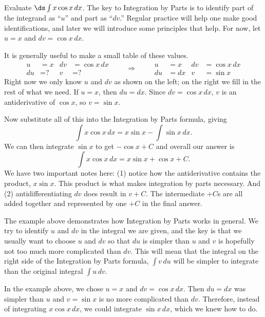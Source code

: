 \begin{example}\label{ex_ibp1}
Evaluate $\ds\int x\cos{x}\,dx$.
\solution
The key to Integration by Parts is to identify part of the integrand as ``$u$'' and part as ``$dv$.'' Regular practice will help one make good identifications, and later we will introduce some principles that help. For now, let  $u=x$ and $dv=\cos{x}\,dx$.

It is generally useful to make a small table of these values.
\[
\begin{aligned}
u&= x & dv&=\cos x\, dx\\
du&= \text{?} & v&=\text{?}
\end{aligned}
\qquad\Rightarrow\qquad
\begin{aligned}
u&= x & dv&=\cos x\, dx\\
du&= dx & v&=\sin x
\end{aligned}
\]
Right now we only know $u$ and $dv$ as shown on the left; on the right we fill in the rest of what we need. If $u = x$, then $du = dx$. Since $dv = \cos x\, dx$, $v$ is an antiderivative of $\cos x$, so $v = \sin x$.

Now substitute all of this into the Integration by Parts formula, giving
\[\int x\cos x\,dx = x\sin x - \int \sin x \,dx.\]
We can then integrate $\sin x$ to get $-\cos x + C$ and overall our answer is
\[\int x\cos x\, dx = x\sin x + \cos x + C.\]
We have two important notes here: (1) notice how the antiderivative contains the product, $x\sin x$. This product is what makes integration by parts necessary. And (2) antidifferentiating $dv$ does result in $v+C$. The intermediate $+C$s are all added together and represented by one $+C$ in the final answer.
\end{example}

The example above demonstrates how Integration by Parts works in general.  We try to identify $u$ and $dv$ in the integral we are given, and the key is that we usually want to choose $u$ and $dv$ so that $du$ is simpler than $u$ and $v$ is hopefully not too much more complicated than $dv$.  This will mean that the integral on the right side of the Integration by Parts formula, $\int v\,du$ will be simpler to integrate than the original integral $\int u\,dv$.

In the example above, we chose $u=x$ and $dv=\cos x\,dx$.  Then $du=dx$ was simpler than $u$ and $v=\sin x$ is no more complicated than $dv$.  Therefore, instead of integrating $x\cos x \,dx$, we could integrate $\sin x\,dx$, which we knew how to do.

